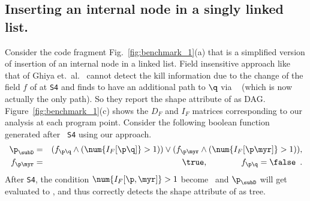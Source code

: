 \subsection{Inserting an internal node in a singly linked list.}
Consider the code fragment Fig.~\ref{fig:benchmark_1}(a) that
is a simplified version of insertion of an internal node in a
linked list.  Field insensitive approach like that of Ghiya
et.~al.~\cite{Ghiya96} cannot detect the kill information due
to the change of the field $f$ of {\tt \p} at {\tt S4} and
finds {\tt \p} to have an additional path to $\q$ via {\tt
  \myr} (which is now actually the only path). So they report
the shape attribute of {\tt \p} as DAG.
Figure~\ref{fig:benchmark_1}(c) shows the $D_F$ and $I_F$ matrices
corresponding to our analysis at each program point.
Consider the following boolean function generated after {\tt
  S4} using our approach.
\begin{eqnarray*}
  \p_{\subD} &=&   (f_{\p\q} \wedge (\num{I_F[\p\q]} > 1)) 
  \vee  (f_{\p\myr} \wedge (\num{I_F[\p\myr]} > 1)), \\
  f_{\p\myr} &=& \true, \qquad\qquad  f_{\p\q} = \false \enspace. 
\end{eqnarray*}
After {\tt S4}, the condition $\num{I_F[\p,\myr]} > 1$ become
\false\ and $\p_{\subD}$ will get evaluated to \false, and
thus correctly detects the shape attribute of {\tt \p} as
tree.

